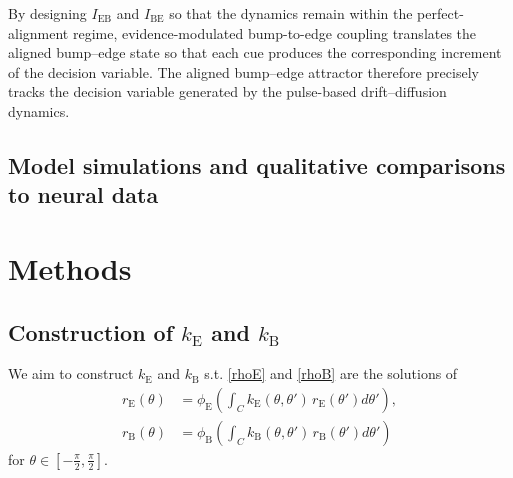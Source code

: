 \documentclass{article}
\newcommand{\rB}{r_{\text{B}}}
\newcommand{\rE}{r_{\text{E}}}
\newcommand{\kB}{k_{\text{B}}}
\newcommand{\kE}{k_{\text{E}}}
\newcommand{\phiB}{\phi_{\text{B}}}
\newcommand{\phiE}{\phi_{\text{E}}}
\newcommand{\IBE}{I_{\text{BE}}}
\newcommand{\IEB}{I_{\text{EB}}}
\newcommand{\cBE}{c_{\text{BE}}}
\newcommand{\neuralspace}{[-\frac\pi2,\frac\pi2]}
\begin{document}
By designing $\IEB$ and $\IBE$ so that the dynamics remain within the perfect-alignment regime, evidence-modulated bump-to-edge coupling translates the aligned bump–edge state so that each cue produces the corresponding increment of the decision variable. The aligned bump–edge attractor therefore precisely tracks the decision variable generated by the pulse-based drift–diffusion dynamics.


\subsection{Model simulations and qualitative comparisons to neural data}



\newpage
\section{Methods}
\subsection{Construction of $\kE$ and $\kB$}

We aim to construct $\kE$ and $\kB$ s.t. \eqref{rhoE} and \eqref{rhoB} are the solutions of 
\begin{equation}
\begin{aligned}
    \rE(\theta) &= \phiE\!\left(\int_C \kE(\theta,\theta')\, \rE(\theta')d\theta'\right),\\
    \rB(\theta) &= \phiB\!\left(\int_C \kB(\theta,\theta')\, \rB(\theta')d\theta'\right)
\end{aligned}
\end{equation}
for $\theta \in \neuralspace$.
 
\end{document}
